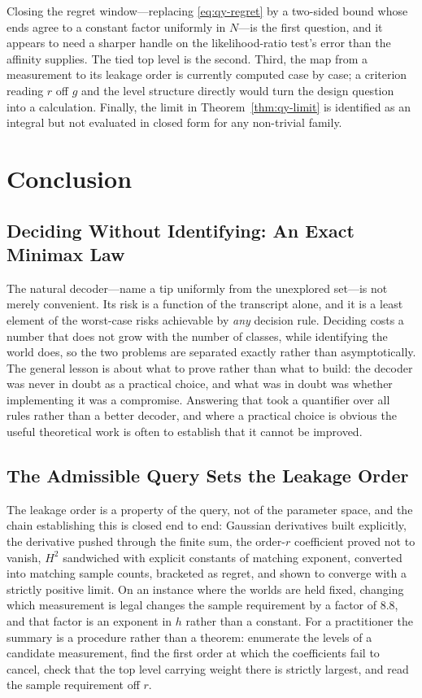 Closing the regret window---replacing \eqref{eq:qy-regret} by a two-sided bound whose ends agree
to a constant factor uniformly in $N$---is the first question, and it appears to need a
sharper handle on the likelihood-ratio test's error than the affinity supplies. The tied top
level is the second. Third, the map from a measurement to its leakage order is currently
computed case by case; a criterion reading $r$ off $g$ and the level structure directly would
turn the design question into a calculation. Finally, the limit in
Theorem~\ref{thm:qy-limit} is identified as an integral but not evaluated in closed form for any
non-trivial family.


\section{Conclusion}

\subsection{Deciding Without Identifying: An Exact Minimax Law}

The natural decoder---name a tip uniformly from the unexplored set---is not merely convenient.
Its risk is a function of the transcript alone, and it is a least element of the worst-case
risks achievable by \emph{any} decision rule. Deciding costs a number that does not grow with
the number of classes, while identifying the world does, so the two problems are separated
exactly rather than asymptotically. The general lesson is about what to prove rather than what
to build: the decoder was never in doubt as a practical choice, and what was in doubt was
whether implementing it was a compromise. Answering that took a quantifier over all rules
rather than a better decoder, and where a practical choice is obvious the useful theoretical
work is often to establish that it cannot be improved.



\subsection{The Admissible Query Sets the Leakage Order}

The leakage order is a property of the query, not of the parameter space, and the chain
establishing this is closed end to end: Gaussian derivatives built explicitly, the derivative
pushed through the finite sum, the order-$r$ coefficient proved not to vanish, $H^{2}$
sandwiched with explicit constants of matching exponent, converted into matching sample
counts, bracketed as regret, and shown to converge with a strictly positive limit. On an
instance where the worlds are held fixed, changing which measurement is legal changes the
sample requirement by a factor of $8.8$, and that factor is an exponent in $h$ rather than a
constant. For a practitioner the summary is a procedure rather than a theorem: enumerate the
levels of a candidate measurement, find the first order at which the coefficients fail to
cancel, check that the top level carrying weight there is strictly largest, and read the
sample requirement off $r$.



